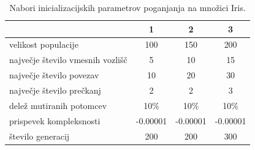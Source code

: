 \begin{table}[H]
    \begin{center}
        \begin{tabular}{||l c c c||}
            \hline
            & 1        & 2        & 3 \\ [0.5ex]
            \hline
            velikost populacije               & 100      & 150      & 200      \\
            \hline
            največje število vmesnih vozlišč & 5        & 10       & 15       \\
            \hline
            največje število povezav          & 10       & 20       & 30       \\
            \hline
            največje število prečkanj         & 2        & 2        & 3        \\
            \hline
            delež mutiranih potomcev          & 10\%     & 10\%     & 10\%     \\
            \hline
            prispevek kompleksnosti           & -0.00001 & -0.00001 & -0.00001 \\
            \hline
            število generacij                 & 200      & 200      & 300      \\
            \hline
        \end{tabular}
    \end{center}
    \caption{Nabori inicializacijskih parametrov poganjanja na množici Iris.}
    \label{tab:param_iris}
\end{table}

